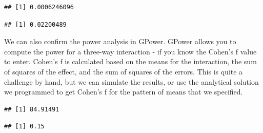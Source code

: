 \documentclass[]{book}
\newenvironment{Shaded}{\begin{snugshade}}{\end{snugshade}}
\newcommand{\CommentTok}[1]{\textcolor[rgb]{0.56,0.35,0.01}{\textit{#1}}}
\newcommand{\DecValTok}[1]{\textcolor[rgb]{0.00,0.00,0.81}{#1}}
\newcommand{\NormalTok}[1]{#1}
\newcommand{\OperatorTok}[1]{\textcolor[rgb]{0.81,0.36,0.00}{\textbf{#1}}}
\begin{document}
\begin{Shaded}
\end{Shaded}

\begin{verbatim}
## [1] 0.0006246096
\end{verbatim}

\begin{Shaded}
\end{Shaded}

\begin{verbatim}
## [1] 0.02200489
\end{verbatim}

We can also confirm the power analysis in GPower. GPower allows you to compute the power for a three-way interaction - if you know the Cohen's f value to enter. Cohen's f is calculated based on the means for the interaction, the sum of squares of the effect, and the sum of squares of the errors. This is quite a challenge by hand, but we can simulate the results, or use the analytical solution we programmed to get Cohen's f for the pattern of means that we specified.

\begin{Shaded}
\end{Shaded}

\begin{verbatim}
## [1] 84.91491
\end{verbatim}

\begin{Shaded}
\end{Shaded}

\begin{verbatim}
## [1] 0.15
\end{verbatim}
\end{document}
